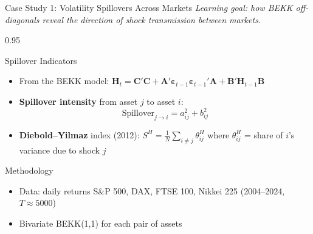 \documentclass[9pt, aspectratio=169, t]{beamer}
\begin{document}
\begin{frame}{Case Study 1: Volatility Spillovers Across Markets}
    \vspace{-2mm}
    {\scriptsize\textit{Learning goal: how BEKK off-diagonals reveal the direction of shock transmission between markets.}}\vspace{1mm}
    \begin{cminipage}{0.95\textwidth}
    {\scriptsize
    \begin{block}{Spillover Indicators}
        \begin{itemize}\setlength{\itemsep}{0pt}
            \item From the BEKK model: $\mathbf{H}_t = \mathbf{C}'\mathbf{C} + \mathbf{A}'\boldsymbol{\varepsilon}_{t-1}\boldsymbol{\varepsilon}_{t-1}'\mathbf{A} + \mathbf{B}'\mathbf{H}_{t-1}\mathbf{B}$
            \item \textbf{Spillover intensity} from asset $j$ to asset $i$:
            \[
                \text{Spillover}_{j \rightarrow i} = a_{ij}^2 + b_{ij}^2
            \]
            \item \textbf{Diebold--Yilmaz} index (2012): $S^H = \frac{1}{N}\sum_{i \neq j} \theta_{ij}^H$ where $\theta_{ij}^H$ = share of $i$'s variance due to shock $j$
        \end{itemize}
    \end{block}
    \begin{alertblock}{Methodology}
        \begin{itemize}\setlength{\itemsep}{0pt}
            \item Data: daily returns S\&P 500, DAX, FTSE 100, Nikkei 225 (2004--2024, $T \approx 5000$)
            \item Bivariate BEKK(1,1) for each pair of assets
        \end{itemize}
    \end{alertblock}
    }
    \end{cminipage}
\end{frame}
\end{document}
